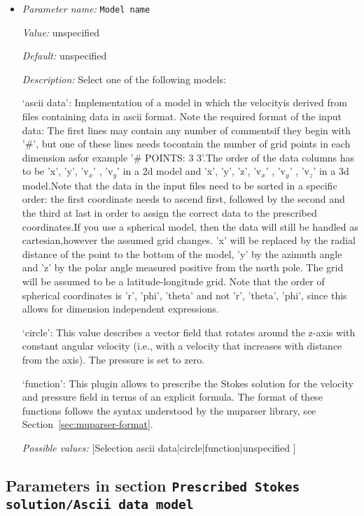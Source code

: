 \begin{itemize}
\item {\it Parameter name:} {\tt Model name}
\label{parameters:Prescribed Stokes solution/Model name}


{\it Value:} unspecified


{\it Default:} unspecified


{\it Description:} Select one of the following models:

`ascii data': Implementation of a model in which the velocityis derived from files containing data in ascii format. Note the required format of the input data: The first lines may contain any number of commentsif they begin with '#', but one of these lines needs tocontain the number of grid points in each dimension asfor example '# POINTS: 3 3'.The order of the data columns has to be 'x', 'y', 'v$_x$' , 'v$_y$' in a 2d model and  'x', 'y', 'z', 'v$_x$' , 'v$_y$' , 'v$_z$' in a 3d model.Note that the data in the input files need to be sorted in a specific order: the first coordinate needs to ascend first, followed by the second and the third at last in order to assign the correct data to the prescribed coordinates.If you use a spherical model, then the data will still be handled as cartesian,however the assumed grid changes. 'x' will be replaced by the radial distance of the point to the bottom of the model, 'y' by the azimuth angle and 'z' by the polar angle measured positive from the north pole. The grid will be assumed to be a latitude-longitude grid. Note that the order of spherical coordinates is 'r', 'phi', 'theta' and not 'r', 'theta', 'phi', since this allows for dimension independent expressions. 

`circle': This value describes a vector field that rotates around the z-axis with constant angular velocity (i.e., with a velocity that increases with distance from the axis). The pressure is set to zero.

`function': This plugin allows to prescribe the Stokes solution for the velocity and pressure field in terms of an explicit formula. The format of these functions follows the syntax understood by the muparser library, see Section~\ref{sec:muparser-format}.


{\it Possible values:} [Selection ascii data|circle|function|unspecified ]
\end{itemize}



\subsection{Parameters in section \tt Prescribed Stokes solution/Ascii data model}
\label{parameters:Prescribed_20Stokes_20solution/Ascii_20data_20model}

